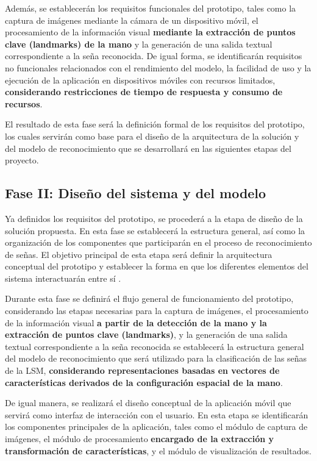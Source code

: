 	Además, se establecerán los requisitos funcionales del prototipo, tales como
	la captura de imágenes mediante la cámara de un dispositivo móvil, el
	procesamiento de la información visual \textbf{mediante la extracción de puntos clave (landmarks) de la mano} y la generación de una salida textual
	correspondiente a la seña reconocida. De igual forma, se identificarán
	requisitos no funcionales relacionados con el rendimiento del modelo, la
	facilidad de uso y la ejecución de la aplicación en dispositivos móviles con
	recursos limitados, \textbf{considerando restricciones de tiempo de respuesta y consumo de recursos}.
	
	El resultado de esta fase será la definición formal de los requisitos del
	prototipo, los cuales servirán como base para el diseño de la arquitectura de
	la solución y del modelo de reconocimiento que se desarrollará en las
	siguientes etapas del proyecto.
		
	\subsection{Fase II: Diseño del sistema y del modelo}
	
	Ya definidos los requisitos del prototipo, se procederá a la etapa de
	diseño de la solución propuesta. En esta fase se establecerá la estructura
	general, así como la organización de los componentes que
	participarán en el proceso de reconocimiento de señas. El objetivo principal
	de esta etapa será definir la arquitectura conceptual del prototipo y
	establecer la forma en que los diferentes elementos del sistema interactuarán
	entre sí \cite{pressman2014,sommerville2016}.
	
	Durante esta fase se definirá el flujo general de funcionamiento del prototipo,
	considerando las etapas necesarias para la captura de imágenes, el
	procesamiento de la información visual \textbf{a partir de la detección de la mano y la extracción de puntos clave (landmarks)}, y la generación de una salida textual
	correspondiente a la seña reconocida se establecerá la estructura
	general del modelo de reconocimiento que será utilizado para la clasificación
	de las señas de la LSM, \textbf{considerando representaciones basadas en vectores de características derivados de la configuración espacial de la mano}.
	
	De igual manera, se realizará el diseño conceptual de la aplicación móvil que
	servirá como interfaz de interacción con el usuario. En esta etapa se
	identificarán los componentes principales de la aplicación, tales como el
	módulo de captura de imágenes, el módulo de procesamiento \textbf{encargado de la extracción y transformación de características}, y el módulo de
	visualización de resultados.
	
